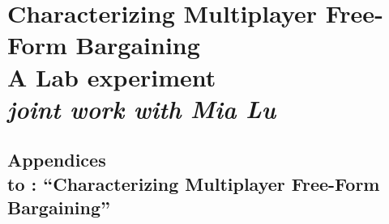 \documentclass[a4paper,11pt,twoside,openright]{report}
\begin{document}
\chapter[Characterizing Multiplayer Free-Form Bargaining]{%
    Characterizing Multiplayer Free-Form Bargaining\\\vspace{0.4cm}%
    \large{A Lab experiment}\\\vspace{0.2cm}%
    \large{\textit{joint work with Mia Lu}}%
}
\label{ch:experiment}

\begin{subappendices}
    \chapter*{
        Appendices\\\vspace{0.4cm}%
        \large{to : ``Characterizing Multiplayer Free-Form Bargaining''}
    }
    
\end{subappendices}

\singlespacing

\printbibliography


\end{document}
